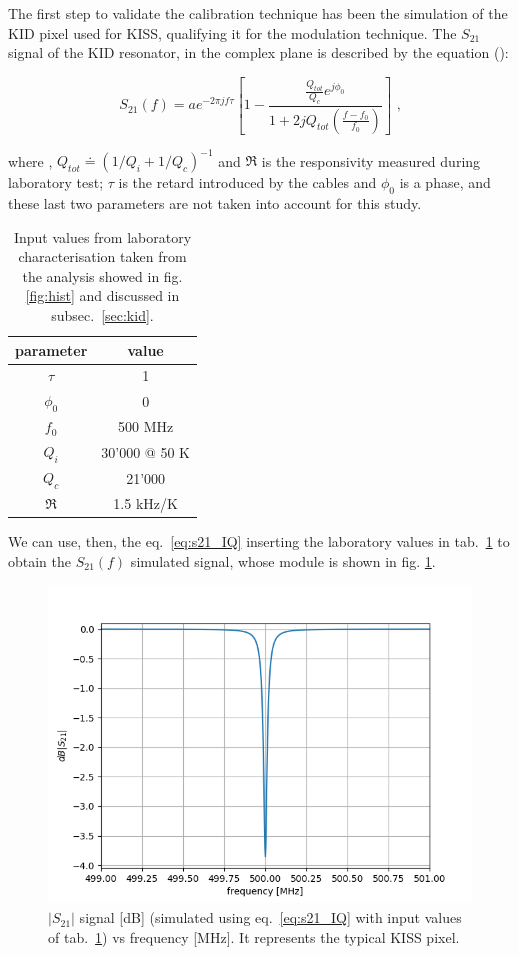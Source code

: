 \documentclass[twocolumn,traditabstract]{aa}\\
\begin{document}
The first step to validate the calibration technique has been the simulation of the KID pixel used for KISS, qualifying it for the modulation technique.
The $S_{21}$ signal of the KID resonator, in the complex plane is described by the equation (\cite{Gao}):

\begin{equation}
S_{21}(f)=ae^{-2\pi j f \tau} \left[ 1-\frac{\frac{Q_{tot}}{Q_c}e^{j\phi_0}}{1+2jQ_{tot}\left(\frac{f-f_0}{f_0}\right)}\right] \text{ ,}
\label{eq:s21_IQ}
\end{equation}

\noindent where , $Q_{tot}\doteq\left( 1/Q_i + 1/Q_c \right)^{-1}$ and $\mathfrak{R}$ is the responsivity measured during laboratory test; $\tau$ is the retard introduced by the cables and $\phi_0$ is a phase, and these last two parameters are not taken into account for this study.

\begin{table}[htf]
	\footnotesize
	\centering
	\caption{Input values from laboratory characterisation taken from the analysis showed in fig. \ref{fig:hist} and discussed in subsec.~\ref{sec:kid}.}
	\begin{tabular}{cc}
		\toprule
		\textbf{parameter} & \textbf{value} \\
		\toprule
		$\tau$ & 1 \\ 
		\midrule 
		$\phi_0$ & 0 \\
		\midrule
		$f_0$ & 500 MHz \\  
		\midrule 
		$Q_i$ & 30'000 @ 50 K \\ 
		\midrule 
		$Q_c$ & 21'000 \\ 
		\midrule 
		$\mathfrak{R}$  & 1.5 kHz/K \\ 
		\bottomrule
	\end{tabular}
	\label{tab:s21_values}
\end{table}

\noindent We can use, then, the eq.~\ref{eq:s21_IQ} inserting the laboratory values in tab.~\ref{tab:s21_values} to obtain the $S_{21}(f)$ simulated signal, whose module is shown in fig. \ref{fig:s21_simu}.

\begin{figure}[htf]
	\centering
	\includegraphics[width=.5\textwidth]{3.acqui/resonance.png}
	\caption{$\left|S_{21} \right|$ signal [dB] (simulated using eq.~\ref{eq:s21_IQ} with input values of tab.~\ref{tab:s21_values}) vs frequency [MHz]. It represents the typical KISS pixel.}
	\label{fig:s21_simu}
\end{figure}
\end{document}
